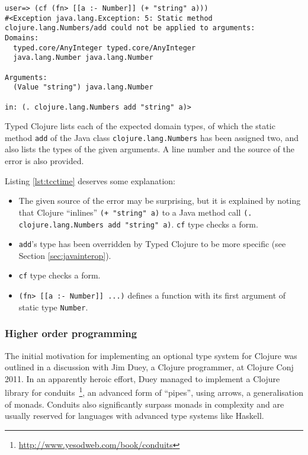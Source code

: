 \begin{lstlisting}[caption=Compile-time errors in Typed Clojure, label=lst:tcctime]
user=> (cf (fn> [[a :- Number]] (+ "string" a)))
#<Exception java.lang.Exception: 5: Static method clojure.lang.Numbers/add could not be applied to arguments:
Domains: 
  typed.core/AnyInteger typed.core/AnyInteger
  java.lang.Number java.lang.Number

Arguments:
  (Value "string") java.lang.Number

in: (. clojure.lang.Numbers add "string" a)>
\end{lstlisting}

Typed Clojure lists each of the expected domain types, of which the static method \lstinline|add| of the Java class
\lstinline|clojure.lang.Numbers| has been assigned two,
and also lists the types of the given arguments.
A line number and the source of the error is also provided.

Listing \ref{lst:tcctime} deserves some explanation:

\begin{itemize}
  \item The given source of the error may be surprising, but it is explained
        by noting that Clojure ``inlines'' \lstinline|(+ "string" a)| to a Java method call
        \lstinline|(. clojure.lang.Numbers add "string" a)|.
        \lstinline|cf| type checks a form.
  \item \lstinline|add|'s type has been overridden by Typed Clojure to be more specific (see Section \ref{sec:javainterop}).
  \item \lstinline|cf| type checks a form.
  \item \lstinline|(fn> [[a :- Number]] ...)| defines a function with its first argument of static type \lstinline|Number|.
\end{itemize}

\subsubsection{Higher order programming}

The initial motivation for implementing an optional type system
for Clojure was outlined in a discussion with Jim Duey, a Clojure programmer, at Clojure Conj 2011.
In an apparently heroic effort, Duey managed to
implement a Clojure library for conduits~\footnote{\url{http://www.yesodweb.com/book/conduits}}, 
an advanced form of ``pipes'', using arrows, a generalisation of monads.
Conduits also significantly surpass monads in complexity and are usually reserved
for languages with advanced type systems like Haskell.

